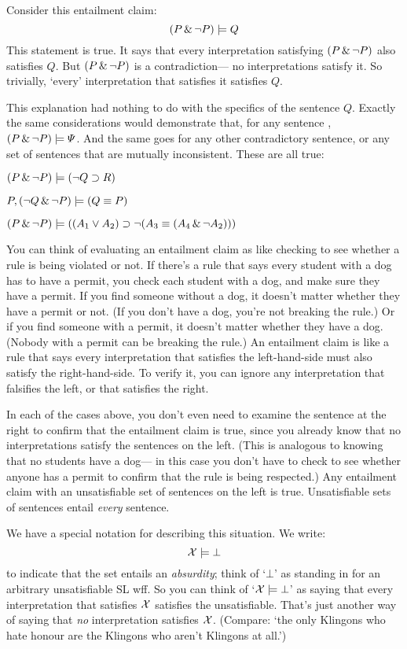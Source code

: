Consider this entailment claim: $$(P \,\&\, \neg P) \models Q$$This statement is true. It says that every interpretation satisfying $(P \,\&\, \neg P)$ also satisfies $Q$. But $(P \,\&\, \neg P)$ is a contradiction--- no interpretations satisfy it. So trivially, `every' interpretation that satisfies it satisfies $Q$.

This explanation had nothing to do with the specifics of the sentence $Q$. Exactly the same considerations would demonstrate that, for any sentence \metaB{}, $(P \,\&\, \neg P) \models \varPsi{}$. And the same goes for any other contradictory sentence, or any set of sentences that are mutually inconsistent. These are all true:

\begin{earg}
\item[] $(P \,\&\, \neg P) \models (\neg Q \supset R)$
\item[] $P, (\neg Q \,\&\, \neg P) \models (Q \equiv P)$
\item[] $(P \,\&\,\neg P) \models ((A_1 \vee A_2) \supset \neg (A_3 \equiv (A_4 \,\&\, \neg A_2)))$
\end{earg}

You can think of evaluating an entailment claim as like checking to see whether a rule is being violated or not. If there's a rule that says every student with a dog has to have a permit, you check each student with a dog, and make sure they have a permit. If you find someone without a dog, it doesn't matter whether they have a permit or not. (If you don't have a dog, you're not breaking the rule.) Or if you find someone with a permit, it doesn't matter whether they have a dog. (Nobody with a permit can be breaking the rule.) An entailment claim is like a rule that says every interpretation that satisfies the left-hand-side must also satisfy the right-hand-side. To verify it, you can ignore any interpretation that falsifies the left, or that satisfies the right.

In each of the cases above, you don't even need to examine the sentence at the right to confirm that the entailment claim is true, since you already know that no interpretations satisfy the sentences on the left. (This is analogous to knowing that no students have a dog--- in this case you don't have to check to see whether anyone has a permit to confirm that the rule is being respected.) Any entailment claim with an unsatisfiable set of sentences on the left is true. Unsatisfiable sets of sentences entail \emph{every} sentence.

We have a special notation for describing this situation. We write: $$\mathcal{X}{} \models \bot$$ to indicate that the set \metaSetX{} entails an \emph{absurdity}; think of `$\bot$' as standing in for an arbitrary unsatisfiable SL wff. So you can think of `$\mathcal{X}{} \models \bot$' as saying that every interpretation that satisfies $\mathcal{X}{}$ satisfies the unsatisfiable. That's just another way of saying that \emph{no} interpretation satisfies $\mathcal{X}{}$. (Compare: `the only Klingons who hate honour are the Klingons who aren't Klingons at all.')

